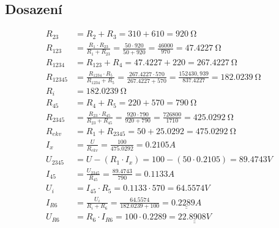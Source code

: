 \subsection{Dosazení}
\begin{figure}[H]
  \begin{equation*}
    \begin{aligned}
         R_{23}  & = R_2 + R_3 = 310 + 610 = 920 \SI{}{\ohm}                                \\
         R_{123}  & = \frac{R_1 \cdot R_{23}}{R_1 + R_{23}} = \frac{50 \cdot 920}{50 + 920} = \frac{46000}{970} = 47.4227 \SI{}{\ohm}                                                            \\
         R_{1234}  & = R_{123} + R_4 = 47.4227 + 220 = 267.4227 \SI{}{\ohm}                     \\
         R_{12345}  & = \frac{R_{1234} \cdot R_5}{R_{1234} + R_5} = \frac{267.4227 \cdot 570}{267.4227 + 570} = \frac{152430,939}{837.4227} = 182.0239 \SI{}{\ohm}                                 \\
         R_i &  = 182.0239 \SI{}{\ohm}                                                                 \\
         R_{45} & = R_4 + R_5 = 220 + 570 = 790\SI{}{\ohm}                                               \\
         R_{2345} & = \frac{R_{23} \cdot R_{45}}{R_{23} + R_{45}} = \frac{920 \cdot 790}{920 + 790} = \frac{726800}{1710} = 425.0292 \SI{}{\ohm}                                                  \\
         R_{ekv} & = R_1 + R_{2345} = 50 + 25.0292 = 475.0292 \SI{}{\ohm}                           \\
         I_x & = \frac{U}{R_{ekv}} = \frac{100}{475.0292} = 0.2105 A                                \\
         U_{2345} & = U - (R_1 \cdot I_x) = 100 - (50 \cdot 0.2105) = 89.4743 V                        \\
         I_{45} & = \frac{U_{2345}}{R_{45}} = \frac{89.4743}{790} = 0.1133 A                            \\
         U_i & = I_{45} \cdot R_5 = 0.1133 \cdot 570 = 64.5574 V                                         \\
         I_{R6} & = \frac{U_i}{R_i + R_6} = \frac{64.5574}{182.0239 + 100} = \underline{\underline{0.2289 A}}      \\
         U_{R6} & = R_6 \cdot I_{R6} = 100 \cdot 0.2289 = \underline{\underline{22.8908 V}}             \\
    \end{aligned}
  \end{equation*}
\end{figure}